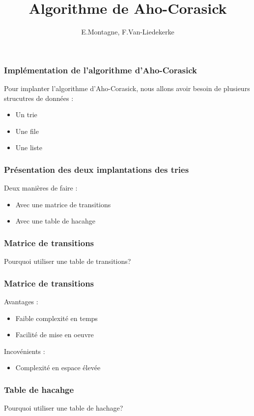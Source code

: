\documentclass{beamer}
\title[Algorithmique du Texte]{Algorithme de Aho-Corasick}
\author{E.Montagne, F.Van-Liedekerke}
\institute[]{Université de Rouen Normandie\\
UFR Sciences et Techniques
}
\begin{document}
  \frame{\titlepage}

  \begin{frame}
    \frametitle{Implémentation de l'algorithme d'Aho-Corasick}

    Pour implanter l'algorithme d'Aho-Corasick, nous allons avoir besoin de 
    plusieurs strucutres de données :
    \begin{itemize}
      \item Un trie
      \item Une file
      \item Une liste
    \end{itemize}

  \end{frame}

  \begin{frame}
    \frametitle{Présentation des deux implantations des tries}
    Deux manières de faire :
    \begin{itemize}
      \item Avec une matrice de transitions
      \item Avec une table de hacahge
    \end{itemize}
    
  \end{frame}

  \begin{frame}
    \frametitle{Matrice de transitions}
    
    Pourquoi utiliser une table de transitions?

  \end{frame}

  \begin{frame}
    \frametitle{Matrice de transitions}
    Avantages :
    \begin{itemize}
      \item Faible complexité en temps
      \item Facilité de mise en oeuvre
    \end{itemize}
    Incovénients :
    \begin{itemize}
      \item Complexité en espace élevée
    \end{itemize}
  \end{frame}

  \begin{frame}
    \frametitle{Table de hacahge}
    
    Pourquoi utiliser une table de hachage?

  \end{frame}
\end{document}
